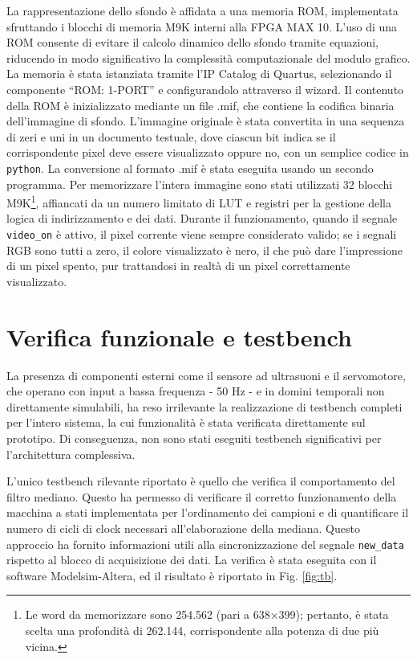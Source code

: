 \documentclass[reprint,amsmath,amssymb,aps,rmp,twoside]{revtex4-2}
\begin{document}
La rappresentazione dello sfondo è affidata a una memoria ROM, implementata sfruttando i blocchi di memoria M9K interni alla FPGA MAX 10. L’uso di una ROM consente di evitare il calcolo dinamico dello sfondo tramite equazioni, riducendo in modo significativo la complessità computazionale del modulo grafico. La memoria è stata istanziata tramite l'IP Catalog di Quartus, selezionando il componente “ROM: 1-PORT” e configurandolo attraverso il wizard. Il contenuto della ROM è inizializzato mediante un file .mif, che contiene la codifica binaria dell'immagine di sfondo. L'immagine originale è stata convertita in una sequenza di zeri e uni in un documento testuale, dove ciascun bit indica se il corrispondente pixel deve essere visualizzato oppure no, con un semplice codice in \texttt{python}. La conversione al formato .mif è stata eseguita usando un secondo programma. Per memorizzare l’intera immagine sono stati utilizzati 32 blocchi M9K\footnote{Le word da memorizzare sono 254.562 (pari a 638×399); pertanto, è stata scelta una profondità di 262.144, corrispondente alla potenza di due più vicina.}, affiancati da un numero limitato di LUT e registri per la gestione della logica di indirizzamento e dei dati. Durante il funzionamento, quando il segnale \texttt{video\_on} è attivo, il pixel corrente viene sempre considerato valido; se i segnali RGB sono tutti a zero, il colore visualizzato è nero, il che può dare l'impressione di un pixel spento, pur trattandosi in realtà di un
pixel correttamente visualizzato.

\vspace{0.5cm}

\section{Verifica funzionale e testbench}

La presenza di componenti esterni come il sensore ad ultrasuoni e il servomotore, che operano con input a bassa frequenza - 50 Hz - e in domini temporali non direttamente simulabili, ha reso irrilevante la realizzazione di testbench completi per l’intero sistema, la cui funzionalità è stata verificata direttamente sul prototipo. Di conseguenza, non sono stati eseguiti testbench significativi per l’architettura complessiva.

L’unico testbench rilevante riportato è quello che verifica il comportamento del filtro mediano. Questo ha permesso di verificare il corretto funzionamento della macchina a stati implementata per l’ordinamento dei campioni e di quantificare il numero di cicli di clock necessari all’elaborazione della mediana. Questo approccio ha fornito informazioni utili alla sincronizzazione del segnale \texttt{new\_data} rispetto al blocco di acquisizione dei dati. La verifica è stata eseguita con il software Modelsim-Altera, ed il risultato è riportato in Fig. \ref{fig:tb}.
\end{document}
